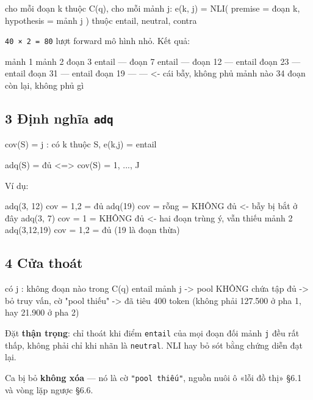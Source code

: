 \documentclass[11pt,a4paper]{article}
\begin{document}
\begin{dia}
cho mỗi đoạn k thuộc C(q),  cho mỗi mảnh j:
     e(k, j)  =  NLI( premise = đoạn k,  hypothesis = mảnh j )  thuộc {entail, neutral, contra}
\end{dia}

\texttt{40 × 2 = 80} lượt forward mô hình nhỏ. Kết quả:

\begin{dia}
            mảnh 1      mảnh 2
đoạn  3     entail        —
đoạn  7     entail        —
đoạn 12       —        entail
đoạn 23       —        entail
đoạn 31       —        entail
đoạn 19       —           —          <- cái bẫy, không phủ mảnh nào
34 đoạn còn lại, không phủ gì
\end{dia}

\subsection{3 Định nghĩa \texttt{adq}}

\begin{dia}
cov(S)  =  { j :  có k thuộc S,  e(k,j) = entail }

adq(S) = đủ   <=>   cov(S) = { 1, ..., J }
\end{dia}

Ví dụ:

\begin{dia}
adq({3, 12})      cov = {1,2}  =  đủ
adq({19})         cov = rỗng      =  KHÔNG đủ        <- bẫy bị bắt ở đây
adq({3, 7})       cov = {1}    =  KHÔNG đủ        <- hai đoạn trùng ý, vẫn thiếu mảnh 2
adq({3,12,19})    cov = {1,2}  =  đủ              (19 là đoạn thừa)
\end{dia}

\subsection{4 Cửa thoát}

\begin{dia}
có j :  không đoạn nào trong C(q) entail mảnh j
   ->  pool KHÔNG chứa tập đủ  ->  bỏ truy vấn, cờ "pool thiếu"
   ->  đã tiêu 400 token (không phải 127.500 ở pha 1, hay 21.900 ở pha 2)
\end{dia}

Đặt \textbf{thận trọng}: chỉ thoát khi điểm \texttt{entail} của mọi đoạn đối mảnh \texttt{j} đều rất thấp, không
phải chỉ khi nhãn là \texttt{neutral}. NLI hay bỏ sót bằng chứng diễn đạt lại.

Ca bị bỏ \textbf{không xóa} — nó là cờ \texttt{"pool thiếu"}, nguồn nuôi ô «lỗi đồ thị» \S{}6.1 và vòng lặp
ngược \S{}6.6.
\end{document}
